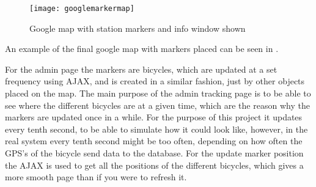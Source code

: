 \begin{figure}[h]
	\centering
	\texttt{[image: googlemarkermap]}
	\caption{Google map with station markers and info window shown}
	\label{fig:googlemapmarkerinfowindow}
\end{figure}

An example of the final google map with markers placed can be seen in .

For the admin page the markers are bicycles, which are updated at a set frequency using AJAX, and is created in a similar fashion, just by other objects placed on the map.
The main purpose of the admin tracking page is to be able to see where the different bicycles are at a given time, which are the reason why the markers are updated once in a while.
For the purpose of this project it updates every tenth second, to be able to simulate how it could look like, however, in the real system every tenth second might be too often, depending on how often the GPS's of the bicycle send data to the database.
For the update marker position the AJAX is used to get all the positions of the different bicycles, which gives a more smooth page than if you were to refresh it.